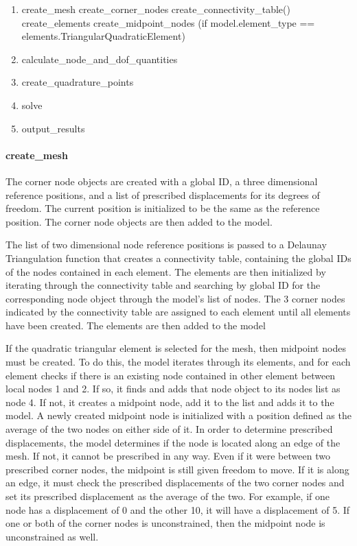 \documentclass[]{spie}  %
\begin{document}
\begin{enumerate}
	\item create\_mesh
	\subitem create\_corner\_nodes
	\subitem create\_connectivity\_table()
	\subitem create\_elements
	\subitem create\_midpoint\_nodes (if model.element\_type == elements.TriangularQuadraticElement)
	\item calculate\_node\_and\_dof\_quantities
	\item create\_quadrature\_points
	\item solve
	\item output\_results
\end{enumerate}

\paragraph{create\_mesh}
The corner node objects are created with a global ID, a three dimensional reference positions, and a list of prescribed displacements for its degrees of freedom. The current position is initialized to be the same as the reference position. The corner node objects are then added to the model. 

The list of two dimensional node reference positions is passed to a Delaunay Triangulation function that creates a connectivity table, containing the global IDs of the nodes contained in each element. The elements are then initialized by iterating through the connectivity table and searching by global ID for the corresponding node object through the model's list of nodes. The 3 corner nodes indicated by the connectivity table are assigned to each element until all elements have been created. The elements are then added to the model

If the quadratic triangular element is selected for the mesh, then midpoint nodes must be created. To do this, the model iterates through its elements, and for each element checks if there is an existing node contained in other element between local nodes 1 and 2. If so, it finds and adds that node object to its nodes list as node 4. If not, it creates a midpoint node, add it to the list and adds it to the model. A newly created midpoint node is initialized with a position defined as the average of the two nodes on either side of it. In order to determine prescribed displacements, the model determines if the node is located along an edge of the mesh. If not, it cannot be prescribed in any way. Even if it were between two prescribed corner nodes, the midpoint is still given freedom to move. If it is along an edge, it must check the prescribed displacements of the two corner nodes and set its prescribed displacement as the average of the two. For example, if one node has a displacement of 0 and the other 10, it will have a displacement of 5. If one or both of the corner nodes is unconstrained, then the midpoint node is unconstrained as well.
\end{document}
